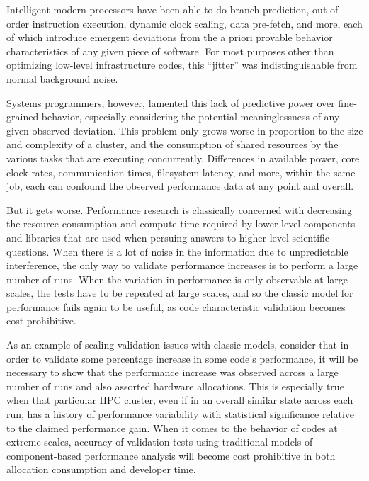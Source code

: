 Intelligent modern processors have been able to do branch-prediction,
out-of-order instruction execution, dynamic clock scaling, data
pre-fetch, and more, each of which introduce emergent deviations from
the a priori provable behavior characteristics of any given piece of
software. For most purposes other than optimizing low-level
infrastructure codes, this ``jitter'' was indistinguishable from
normal background noise.

Systems programmers, however, lamented this lack of predictive power
over fine-grained behavior, especially considering the potential
meaninglessness of any given observed
deviation.   This
problem only grows worse in proportion to the size and complexity of a
cluster, and the consumption of shared resources by the various tasks
that are executing concurrently.  Differences in available power, core
clock rates, communication times, filesystem latency, and more, within
the same job, each can confound the observed performance data at any
point and overall.

But it gets worse.  Performance research is classically concerned with
decreasing the resource consumption and compute time required by
lower-level components and libraries that are used when persuing
answers to higher-level scientific questions.  When there is a lot of
noise in the information due to unpredictable interference, the only
way to validate performance increases is to perform a large number of
runs. When the variation in performance is only observable at large
scales, the tests have to be repeated at large scales, and so the
classic model for performance fails again to be useful, as code
characteristic validation becomes cost-prohibitive.

As an example of scaling validation issues with classic models,
consider that in order to validate some percentage increase in some
code's performance, it will be necessary to show that the performance
increase was observed across a large number of runs and also assorted
hardware allocations.  This is especially true when that particular
HPC cluster, even if in an overall similar state across each run, has
a history of performance variability with statistical significance
relative to the claimed performance gain. When it comes to the
behavior of codes at extreme scales, accuracy of validation tests
using traditional models of component-based performance analysis will
become cost prohibitive in both allocation consumption and developer
time.


